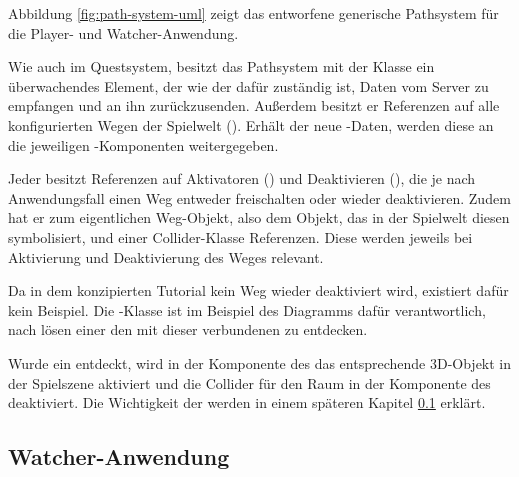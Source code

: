 Abbildung \ref{fig:path-system-uml} zeigt das entworfene generische Pathsystem für die Player- und Watcher-Anwendung.

Wie auch im Questsystem, besitzt das Pathsystem mit der Klasse  ein überwachendes Element, der wie der  dafür zuständig ist, Daten vom Server zu empfangen und an ihn zurückzusenden. Außerdem besitzt er Referenzen auf alle konfigurierten Wegen der Spielwelt (). Erhält der  neue -Daten, werden diese an die jeweiligen -Komponenten weitergegeben.

Jeder  besitzt Referenzen auf Aktivatoren () und Deaktivieren (), die je nach Anwendungsfall einen Weg entweder freischalten oder wieder deaktivieren. Zudem hat er zum eigentlichen Weg-Objekt, also dem Objekt, das in der Spielwelt diesen  symbolisiert, und einer Collider-Klasse Referenzen. Diese werden jeweils bei Aktivierung und Deaktivierung des Weges relevant.

Da in dem konzipierten Tutorial kein Weg wieder deaktiviert wird, existiert dafür kein Beispiel. Die -Klasse ist im Beispiel des Diagramms dafür verantwortlich, nach lösen einer  den mit dieser  verbundenen  zu entdecken.

Wurde ein  entdeckt, wird in der Komponente des  das entsprechende \ac{3D}-Objekt in der Spielszene aktiviert und die Collider für den Raum in der Komponente des  deaktiviert. Die Wichtigkeit der  werden in einem späteren Kapitel \ref{} erklärt. 






\subsection{Watcher-Anwendung}


